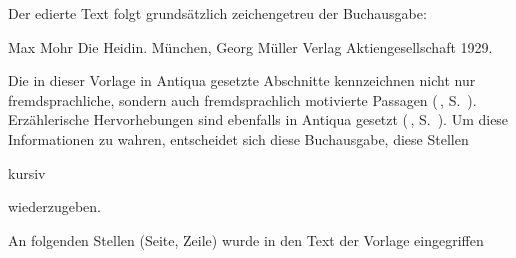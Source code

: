 


Der edierte Text folgt grundsätzlich zeichengetreu der Buchausgabe:

Max Mohr\dopp{} Die Heidin. München, Georg Müller Verlag Aktiengesellschaft
1929.

Die in dieser Vorlage in Antiqua gesetzte Abschnitte kennzeichnen nicht nur
fremdsprachliche, sondern auch fremdsprachlich motivierte Passagen
(\,, S.~\pageref{lS47-1}). Erzählerische
Hervorhebungen sind ebenfalls in Antiqua gesetzt (\,,
S.~\pageref{lS48-1}).
Um diese Informationen zu wahren, entscheidet sich diese Buchausgabe,
diese Stellen \begin{it}kursiv\end{it} wiederzugeben.

An folgenden Stellen (Seite, Zeile) wurde in den Text der
Vorlage eingegriffen\dopp{}

\theendnotes
